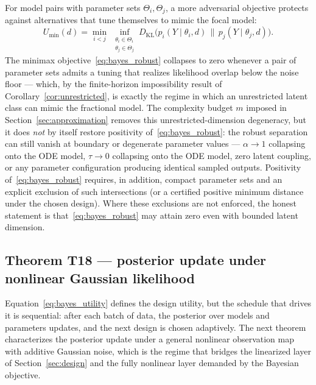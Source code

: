For model pairs with parameter sets $\Theta_i, \Theta_j$, a more adversarial objective protects against alternatives that tune themselves to mimic the focal model:
\begin{equation}
U_{\min}(d)
= \min_{i < j}\, \inf_{\substack{\theta_i \in \Theta_i \\ \theta_j \in \Theta_j}}
D_{\mathrm{KL}}\!\bigl(
p_i(Y \mid \theta_i, d)\,\big\|\, p_j(Y \mid \theta_j, d)
\bigr).
\label{eq:bayes_robust}
\end{equation}
The minimax objective~\eqref{eq:bayes_robust} collapses to zero whenever a pair of parameter sets admits a tuning that realizes likelihood overlap below the noise floor --- which, by the finite-horizon impossibility result of Corollary~\ref{cor:unrestricted}, is exactly the regime in which an unrestricted latent class can mimic the fractional model. The complexity budget $m$ imposed in Section~\ref{sec:approximation} removes this unrestricted-dimension degeneracy, but it does \emph{not} by itself restore positivity of~\eqref{eq:bayes_robust}: the robust separation can still vanish at boundary or degenerate parameter values --- $\alpha \to 1$ collapsing onto the ODE model, $\tau \to 0$ collapsing onto the ODE model, zero latent coupling, or any parameter configuration producing identical sampled outputs. Positivity of~\eqref{eq:bayes_robust} requires, in addition, compact parameter sets and an explicit exclusion of such intersections (or a certified positive minimum distance under the chosen design). Where these exclusions are not enforced, the honest statement is that~\eqref{eq:bayes_robust} may attain zero even with bounded latent dimension.

\subsection{Theorem T18 --- posterior update under nonlinear Gaussian likelihood}
\label{subsec:bayes:T18}

Equation~\eqref{eq:bayes_utility} defines the design utility, but the schedule that drives it is sequential: after each batch of data, the posterior over models and parameters updates, and the next design is chosen adaptively. The next theorem characterizes the posterior update under a general nonlinear observation map with additive Gaussian noise, which is the regime that bridges the linearized layer of Section~\ref{sec:design} and the fully nonlinear layer demanded by the Bayesian objective.


